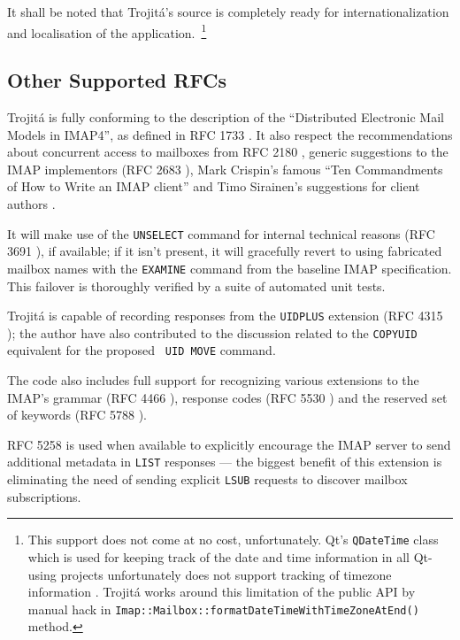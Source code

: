 \documentclass[trojita]{subfiles}
\begin{document}
It shall be noted that Trojitá's source is completely ready for internationalization and localisation of the
application.~\footnote{This support does not come at no cost, unfortunately.  Qt's {\tt QDateTime} class which is used
for keeping track of the date and time information in all Qt-using projects unfortunately does not support tracking of
timezone information \cite{qt-qdatetime-tz}.  Trojitá works around this limitation of the public API by manual hack in
{\tt Imap::Mailbox::formatDateTimeWithTimeZoneAtEnd()} method.}

\subsection{Other Supported RFCs}

Trojitá is fully conforming to the description of the ``Distributed Electronic Mail Models in IMAP4'', as defined in RFC
1733 \cite{rfc1733}.  It also respect the recommendations about concurrent access to mailboxes from RFC 2180
\cite{rfc2180}, generic suggestions to the IMAP implementors (RFC 2683 \cite{rfc2683}), Mark Crispin's famous ``Ten
Commandments of How to Write an IMAP client'' \cite{crispin-ten-commandments} and Timo Sirainen's suggestions for client
authors \cite{tss-client-coding-howto} \cite{imapwiki-client-best-practices}.

It will make use of the {\tt UNSELECT} command for internal technical reasons (RFC 3691 \cite{rfc3691}), if available;
if it isn't present, it will gracefully revert to using fabricated mailbox names with the {\tt EXAMINE} command from the
baseline IMAP specification.  This failover is thoroughly verified by a suite of automated unit tests.

Trojitá is capable of recording responses from the {\tt UIDPLUS} extension (RFC 4315 \cite{rfc4315}); the author have
also contributed \cite{jkt-move-uidplus} to the discussion related to the {\tt COPYUID} equivalent for the proposed {\tt
UID MOVE} command.

The code also includes full support for recognizing various extensions to the IMAP's grammar (RFC 4466 \cite{rfc4466}),
response codes (RFC 5530 \cite{rfc5530}) and the reserved set of keywords (RFC 5788 \cite{rfc5788}).

RFC 5258 \cite{rfc5258} is used when available to explicitly encourage the IMAP server to send additional metadata in
{\tt LIST} responses --- the biggest benefit of this extension is eliminating the need of sending explicit {\tt LSUB}
requests to discover mailbox subscriptions.
\end{document}
